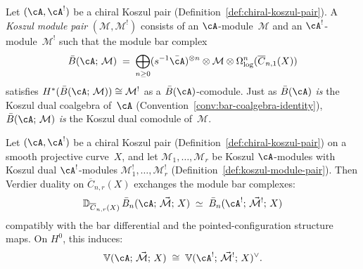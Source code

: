 \begin{definition}\label{def:koszul-module-pair}
Let $(\cA, \cA^!)$ be a chiral Koszul pair
(Definition~\ref{def:chiral-koszul-pair}).  A \emph{Koszul module pair}
$(\mathcal{M}, \mathcal{M}^!)$ consists of an $\cA$-module~$\mathcal{M}$
and an $\cA^!$-module~$\mathcal{M}^!$ such that the module bar
complex
\[
\bar{B}(\cA;\, \mathcal{M})
\;=\;
\bigoplus_{n \ge 0}
(s^{-1}\bar{\cA})^{\otimes n} \otimes \mathcal{M}
\otimes \Omega^n_{\log}(\overline{C}_{n,1}(X))
\]
satisfies
$H^*(\bar{B}(\cA;\, \mathcal{M})) \cong \mathcal{M}^!$
as a $\bar{B}(\cA)$-comodule.
Just as $\bar{B}(\cA)$ \emph{is} the Koszul dual coalgebra
of~$\cA$ (Convention~\ref{conv:bar-coalgebra-identity}),
$\bar{B}(\cA;\, \mathcal{M})$ \emph{is} the Koszul dual
comodule of~$\mathcal{M}$.
\end{definition}

\begin{theorem}
\label{thm:module-bar-verdier}
Let $(\cA, \cA^!)$ be a chiral Koszul pair
\textup{(}Definition~\textup{\ref{def:chiral-koszul-pair}}\textup{)}
on a smooth projective curve~$X$, and let
$\mathcal{M}_1, \ldots, \mathcal{M}_r$ be Koszul
$\cA$-modules with Koszul dual $\cA^!$-modules
$\mathcal{M}_1^!, \ldots, \mathcal{M}_r^!$
\textup{(}Definition~\textup{\ref{def:koszul-module-pair}}\textup{)}.
Then Verdier duality on $\overline{C}_{n,r}(X)$ exchanges the
module bar complexes:
\begin{equation}\label{eq:module-bar-verdier}
\mathbb{D}_{\overline{C}_{n,r}(X)}\,
\bar{B}_n(\cA;\, \vec{\mathcal{M}};\, X)
\;\simeq\;
\bar{B}_n(\cA^!;\, \vec{\mathcal{M}}^!;\, X)
\end{equation}
compatibly with the bar differential and the pointed-configuration
structure maps.  On $H^0$, this induces:
\begin{equation}\label{eq:conformal-block-verdier}
\mathbb{V}(\cA;\, \vec{\mathcal{M}};\, X)
\;\cong\;
\mathbb{V}(\cA^!;\, \vec{\mathcal{M}}^!;\, X)^\vee.
\end{equation}
\end{theorem}

